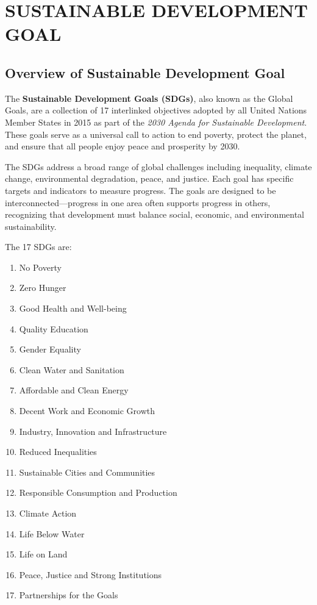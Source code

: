 \chapter{SUSTAINABLE DEVELOPMENT GOAL}

\section{Overview of Sustainable Development Goal}

The \textbf{Sustainable Development Goals (SDGs)}, also known as the Global Goals, are a collection of 17 interlinked objectives adopted by all United Nations Member States in 2015 as part of the \textit{2030 Agenda for Sustainable Development}. These goals serve as a universal call to action to end poverty, protect the planet, and ensure that all people enjoy peace and prosperity by 2030.

The SDGs address a broad range of global challenges including inequality, climate change, environmental degradation, peace, and justice. Each goal has specific targets and indicators to measure progress. The goals are designed to be interconnected---progress in one area often supports progress in others, recognizing that development must balance social, economic, and environmental sustainability.

The 17 SDGs are:
\begin{enumerate}[leftmargin=2em]
    \item No Poverty
    \item Zero Hunger
    \item Good Health and Well-being
    \item Quality Education
    \item Gender Equality
    \item Clean Water and Sanitation
    \item Affordable and Clean Energy
    \item Decent Work and Economic Growth
    \item Industry, Innovation and Infrastructure
    \item Reduced Inequalities
    \item Sustainable Cities and Communities
    \item Responsible Consumption and Production
    \item Climate Action
    \item Life Below Water
    \item Life on Land
    \item Peace, Justice and Strong Institutions
    \item Partnerships for the Goals
\end{enumerate}

